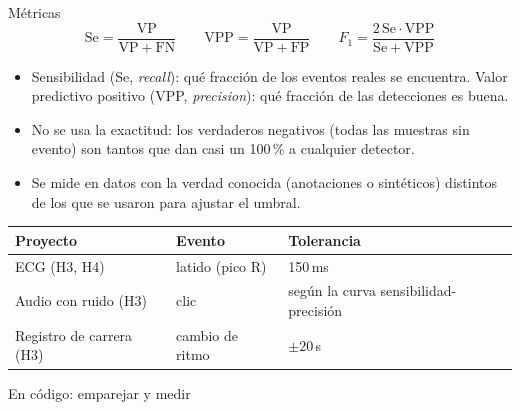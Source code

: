 \documentclass[aspectratio=169,11pt]{beamer}
\begin{document}
\begin{frame}{Métricas}
  \footnotesize
  \[
    \mathrm{Se}=\frac{\mathrm{VP}}{\mathrm{VP}+\mathrm{FN}}\qquad
    \mathrm{VPP}=\frac{\mathrm{VP}}{\mathrm{VP}+\mathrm{FP}}\qquad
    F_1=\frac{2\,\mathrm{Se}\cdot\mathrm{VPP}}{\mathrm{Se}+\mathrm{VPP}}
  \]
  \begin{itemize}
    \item \alert{Sensibilidad} (Se, \textit{recall}): qué fracción de los eventos reales se encuentra. \alert{Valor predictivo positivo} (VPP, \textit{precision}): qué fracción de las detecciones es buena.
    \item No se usa la exactitud: los verdaderos negativos (todas las muestras sin evento) son tantos que dan casi un 100\,\% a cualquier detector.
    \item Se mide en datos con la verdad conocida (anotaciones o sintéticos) \alert{distintos} de los que se usaron para ajustar el umbral.
  \end{itemize}
  \medskip
  \begin{tabular}{@{}lll@{}}
    \toprule
    Proyecto & Evento & Tolerancia \\ \midrule
    ECG (H3, H4) & latido (pico R) & 150\,ms \\
    Audio con ruido (H3) & clic & según la curva sensibilidad-precisión \\
    Registro de carrera (H3) & cambio de ritmo & $\pm20$\,s \\
    \bottomrule
  \end{tabular}
\end{frame}

\begin{frame}{En código: emparejar y medir}
\end{frame}
\end{document}
